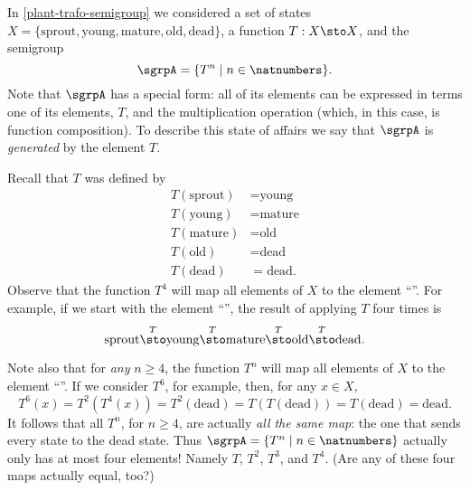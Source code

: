 

\section{}




In \cref{plant-trafo-semigroup} we considered a set of states $X = \{ \text{sprout}, \text{young}, \text{mature}, \text{old}, \text{dead} \}$, a function $T: X \sto X$, and the semigroup
\begin{equation}
\sgrpA = \{ T^n \mid n \in \natnumbers \}.
\end{equation}
Note that $\sgrpA$ has a special form: all of its elements can be expressed in terms one of its elements, $T$, and the multiplication operation (which, in this case, is function composition). To describe this state of affairs we say that $\sgrpA$ is \emph{generated} by the element $T$. 


Recall that $T$ was defined by 
\begin{align*}
T(\text{sprout}) &=  \text{young} \\
T(\text{young}) &=  \text{mature} \\
T(\text{mature}) &=  \text{old} \\
T( \text{old}) &= \text{dead} \\
T (\text{dead}) &= \text{dead}.
\end{align*}
Observe that the function $T^4$ will map all elements of $X$ to the element ``''. For example, if we start with the element ``'', the result of applying $T$ four times is 
$$
\text{sprout} \overset{T}{\sto} \text{young} \overset{T}{\sto} \text{mature} \overset{T}{\sto} \text{old} \overset{T}{\sto} \text{dead}.
$$

Note also that for \emph{any} $n \geq 4$, the function $T^n$ will map all elements of $X$ to the element ``''.
If we consider $T^6$, for example, then, for any $x \in X$,
$$
T^6(x) = T^2(T^4(x)) = T^2(\text{dead}) = T(T(\text{dead})) = T(\text{dead}) = \text{dead}. 
$$
It follows that all $T^n$, for $n \geq 4$, are actually \emph{all the same map}: the one that sends every state to the dead state. Thus $\sgrpA = \{ T^n \mid n \in \natnumbers \}$ actually only has at most four elements! Namely $T$, $T^2$, $T^3$, and $T^4$. (Are any of these four maps actually equal, too?)

